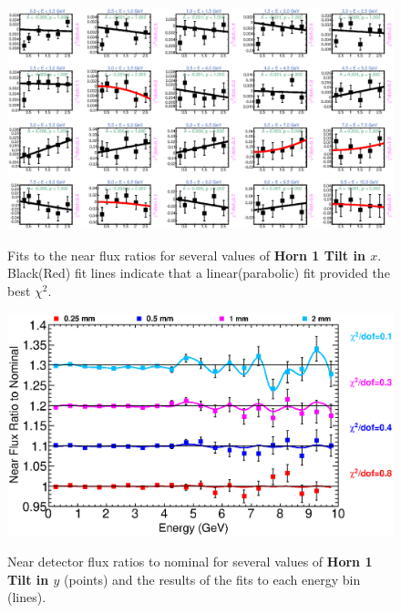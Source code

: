 \begin{figure}[ht]
  \begin{center}
    {\includegraphics[width=5.0in]{figures/Horn1XTilt_near_fits.eps}}
  \end{center}
\caption{ Fits to the near flux ratios for several values of {\bf Horn 1 Tilt in $x$}. Black(Red) fit lines indicate that a linear(parabolic) fit provided the best $\chi^2$. }
\end{figure}

\begin{figure}[ht]
  \begin{center}
    {\includegraphics[width=6.0in]{figures/Horn1YTilt_near_summary.eps}}
  \end{center}
\caption{ Near detector flux ratios to nominal for several values of {\bf Horn 1 Tilt in $y$} (points) and the results of the fits to each energy bin (lines).}
\end{figure}

